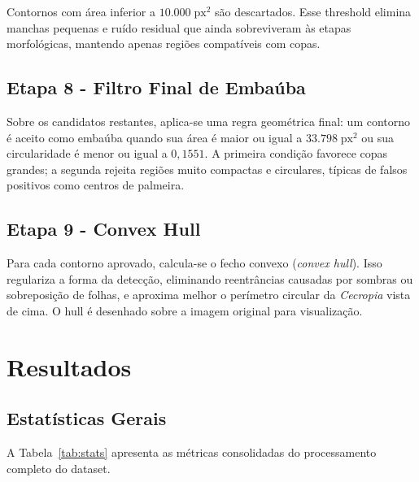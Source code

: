 \documentclass[12pt, a4paper]{article}
\begin{document}
Contornos com área inferior a $10.000\;\text{px}^2$ são descartados. Esse
threshold elimina manchas pequenas e ruído residual que ainda sobreviveram às
etapas morfológicas, mantendo apenas regiões compatíveis com copas.

\subsection{Etapa 8 - Filtro Final de Embaúba}

Sobre os candidatos restantes, aplica-se uma regra geométrica final: um contorno
é aceito como embaúba quando sua área é maior ou igual a $33.798\;\text{px}^2$
ou sua circularidade é menor ou igual a $0,1551$. A primeira condição favorece
copas grandes; a segunda rejeita regiões muito compactas e circulares, típicas
de falsos positivos como centros de palmeira.

\subsection{Etapa 9 - Convex Hull}

Para cada contorno aprovado, calcula-se o fecho convexo (\textit{convex hull}).
Isso regulariza a forma da detecção, eliminando reentrâncias causadas por
sombras ou sobreposição de folhas, e aproxima melhor o perímetro circular da
\textit{Cecropia} vista de cima. O hull é desenhado sobre a imagem original para
visualização.

\section{Resultados}

\subsection{Estatísticas Gerais}

A Tabela~\ref{tab:stats} apresenta as métricas consolidadas do processamento
completo do dataset.
\end{document}
